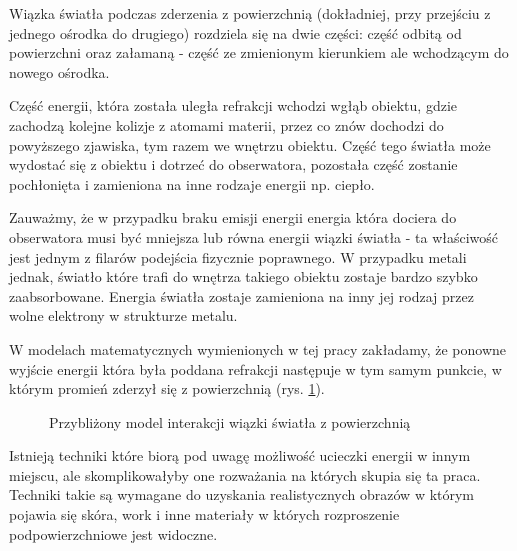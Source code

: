 \documentclass[../main.tex]{subfiles}
\begin{document}
Wiązka światła podczas zderzenia z powierzchnią (dokładniej, przy przejściu z
jednego ośrodka do drugiego) rozdziela się na dwie części: część odbitą od
powierzchni oraz załamaną - część ze zmienionym kierunkiem ale wchodzącym do
nowego ośrodka.

Część energii, która została uległa refrakcji wchodzi wgłąb obiektu, gdzie
zachodzą kolejne kolizje z atomami materii, przez co znów dochodzi do
powyższego zjawiska, tym razem we wnętrzu obiektu. Część tego światła może
wydostać się z obiektu i dotrzeć do obserwatora, pozostała część zostanie
pochłonięta i zamieniona na inne rodzaje energii np. ciepło.

Zauważmy, że w przypadku braku emisji energii energia która dociera do
obserwatora musi być mniejsza lub równa energii wiązki światła - ta właściwość
jest jednym z filarów podejścia fizycznie poprawnego. W przypadku metali
jednak, światło które trafi do wnętrza takiego obiektu zostaje bardzo szybko
zaabsorbowane. Energia światła zostaje zamieniona na inny jej rodzaj przez
wolne elektrony w strukturze metalu.

W modelach matematycznych wymienionych w tej pracy zakładamy, że ponowne
wyjście energii która była poddana refrakcji następuje w tym samym punkcie, w
którym promień zderzył się z powierzchnią (rys. \ref{fig:ReflectionRefraction}).

\begin{figure}[h]
  \centering
  \caption{Przybliżony model interakcji wiązki światła z powierzchnią}
  \label{fig:ReflectionRefraction}
\end{figure}

Istnieją techniki które biorą pod uwagę możliwość ucieczki energii w innym
miejscu, ale skomplikowałyby one rozważania na których skupia się ta praca.
Techniki takie są wymagane do uzyskania realistycznych obrazów w którym pojawia
się skóra, work i inne materiały w których rozproszenie podpowierzchniowe
jest widoczne.
\end{document}
